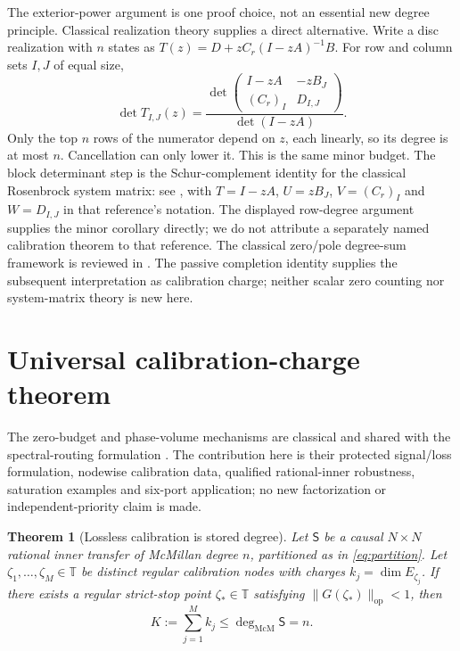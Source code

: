 \documentclass[11pt]{article}
\newtheorem{theorem}{Theorem}[section]
\theoremstyle{definition}
\theoremstyle{remark}
\newcommand{\T}{\mathbb{T}}
\newcommand{\op}{\mathrm{op}}
\newcommand{\mcdeg}{\deg_{\mathrm{McM}}}
\begin{document}
The exterior-power argument is one proof choice, not an essential new
degree principle. Classical realization theory supplies a direct alternative.
Write a disc realization with $n$ states as
$T(z)=D+zC_r(I-zA)^{-1}B$. For row and column sets $I,J$ of equal size,
\[
 \det T_{I,J}(z)=
 \frac{\det\begin{pmatrix}I-zA&-zB_J\\(C_r)_I&D_{I,J}\end{pmatrix}}
 {\det(I-zA)}.
\]
Only the top $n$ rows of the numerator depend on $z$, each linearly, so its
degree is at most $n$. Cancellation can only lower it. This is the same
minor budget. The block determinant step is the Schur-complement identity
for the classical Rosenbrock system matrix: see
\cite[Section~1, Eq.~(1) and its following transfer-function formula]{DopicoQuintanaVanDooren2022},
with $T=I-zA$, $U=zB_J$, $V=(C_r)_I$ and $W=D_{I,J}$ in that reference's
notation. The displayed row-degree argument supplies the minor corollary
directly; we do not attribute a separately named calibration theorem to that
reference. The classical zero/pole degree-sum framework is reviewed in
\cite[Theorem~1 and Section~3]{DopicoQuintanaVanDooren2022}. The passive
completion identity supplies the subsequent interpretation as calibration
charge; neither scalar zero counting nor system-matrix theory is new here.

\section{Universal calibration-charge theorem}

The zero-budget and phase-volume mechanisms are classical and shared with
the spectral-routing formulation \cite{ErikssonRouting2026}. The contribution
here is their protected signal/loss formulation, nodewise calibration data,
qualified rational-inner robustness, saturation examples and six-port
application; no new factorization or independent-priority claim is made.


\begin{theorem}[Lossless calibration is stored degree]
\label{thm:charge}
Let $\mathsf S$ be a causal $N\times N$ rational inner transfer of McMillan
degree $n$, partitioned as in \eqref{eq:partition}.  Let
$\zeta_1,\ldots,\zeta_M\in\T$ be distinct regular calibration nodes with
charges $k_j=\dim E_{\zeta_j}$.  If there exists a regular strict-stop point
$\zeta_*\in\T$ satisfying $\|G(\zeta_*)\|_{\op}<1$, then
\begin{equation}\label{eq:chargebound}
 K:=\sum_{j=1}^M k_j\leq \mcdeg\mathsf S=n.
\end{equation}
\end{theorem}
\end{document}
